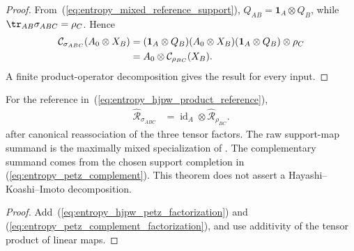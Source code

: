 \begin{proof}\leanok
    From~(\ref{eq:entropy_mixed_reference_support}),
    $Q_{AB}=\mathbf 1_A\otimes Q_B$, while
    $\tr_{AB}\sigma_{ABC}=\rho_C$. Hence
    \begin{align}
        \mathcal C_{\sigma_{ABC}}(A_0\otimes X_B)
        &=(\mathbf 1_A\otimes Q_B)(A_0\otimes X_B)
          (\mathbf 1_A\otimes Q_B)\otimes\rho_C
        \notag\\
        &=A_0\otimes\mathcal C_{\rho_{BC}}(X_B).
        \notag
    \end{align}
    A finite product-operator decomposition gives the result for every input.
\end{proof}

\begin{theorem}
    \label{thm:entropy_completed_petz_maximally_mixed_tensor}
    \leanok
    For the reference in~(\ref{eq:entropy_hjpw_product_reference}),
    \begin{align}
        \widehat{\mathcal R}_{\sigma_{ABC}}
        &=\operatorname{id}_A\otimes
          \widehat{\mathcal R}_{\rho_{BC}}.
        \label{eq:entropy_completed_petz_factorization}
    \end{align}
    after canonical reassociation of the three tensor factors. The raw
    support-map summand is the maximally mixed specialization of
    \cite[equation~(10)]{Hayden2004Structure}. The complementary summand comes
    from the chosen support completion in
    (\ref{eq:entropy_petz_complement}). This theorem does not assert a
    Hayashi--Koashi--Imoto decomposition.
\end{theorem}

\begin{proof}\leanok
    Add~(\ref{eq:entropy_hjpw_petz_factorization}) and
    (\ref{eq:entropy_petz_complement_factorization}), and use additivity of the
    tensor product of linear maps.
\end{proof}

